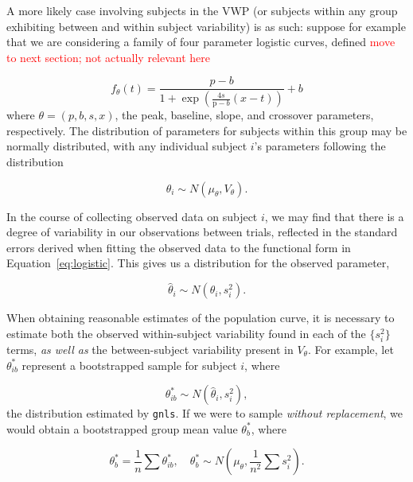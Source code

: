 \documentclass{article}
\newcommand{\xt}{\texttt}
\providecommand{\pb}[1]{\textcolor{red}{#1}}
\begin{document}
A more likely case involving subjects in the VWP (or subjects within any group exhibiting between and within subject variability) is as such: suppose for example that we are considering a family of four parameter logistic curves, defined \pb{move to next section; not actually relevant here}

\begin{equation}\label{eq:logistic}
f_{\theta}(t) = \frac{p-b}{1 + \exp \left(\frac{4s}{\text{p}-b} (x - t) \right)} + b
\end{equation}
where $\theta = (p, b, s, x)$, the peak, baseline, slope, and crossover parameters, respectively. The distribution of parameters for subjects within this group may be normally distributed, with any individual subject $i$'s parameters following the distribution

\begin{equation}
\theta_i \sim N(\mu_{\theta}, V_{\theta}).
\end{equation}

In the course of collecting observed data on subject $i$, we may find that there is a degree of variability in our observations between trials, reflected in the standard errors derived when fitting the observed data to the functional form in Equation~\ref{eq:logistic}. This gives us a distribution for the observed parameter, 

\begin{equation}
\hat{\theta}_i \sim N(\theta_i, s_i^2).
\end{equation}

When obtaining reasonable estimates of the population curve, it is necessary to estimate both the observed within-subject variability found in each of the $\{s_i^2\}$ terms, \textit{as well as} the between-subject variability present in $V_{\theta}$. For example, let $\theta^*_{ib}$ represent a bootstrapped sample for subject $i$, where

\begin{equation}\label{eq:sub_boot_dist}
\theta^*_{ib} \sim N(\hat{\theta}_i, s_i^2),
\end{equation}
the distribution estimated by \xt{gnls}. If we were to sample \textit{without replacement}, we would obtain a bootstrapped group mean value $\theta^*_b$, where

\begin{equation}\label{eq:wo_rep_boot}
\theta^{*}_b = \frac1n \sum \theta^{*}_{ib}, \quad \theta^{*}_b  \sim N \left( \mu_{\theta}, \frac{1}{n^2} \sum s_i^2 \right).
\end{equation}
\end{document}

